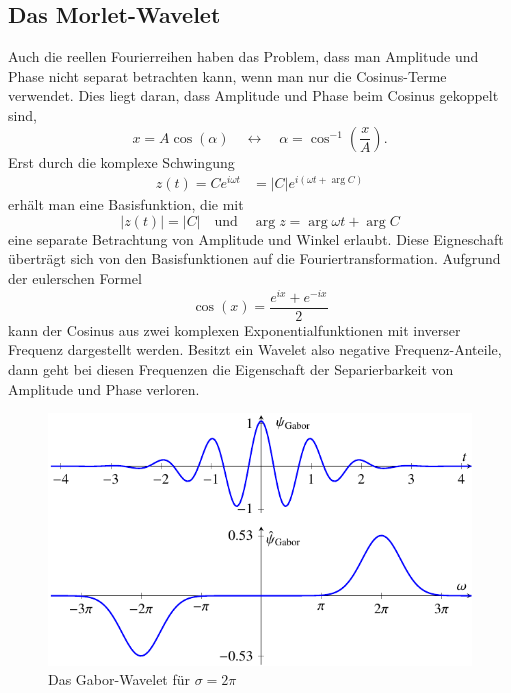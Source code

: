 \begin{refsection}

\section{Das Morlet-Wavelet}
Auch die reellen Fourierreihen haben das Problem, dass man Amplitude und Phase nicht separat betrachten kann, wenn man nur die Cosinus-Terme verwendet.
Dies liegt daran, dass Amplitude und Phase beim Cosinus gekoppelt sind,
\[
x = A\cos(\alpha) \quad\leftrightarrow\quad \alpha = \cos^{-1}\left(\frac{x}{A}\right).
\]
Erst durch die komplexe Schwingung 
\begin{align*}
	z(t) = Ce^{i\omega t} &= |C|e^{i\left(\omega t + \arg C\right)}
\end{align*}
erhält man eine Basisfunktion, die mit
\[
	|z(t)| = |C| \quad \text{und}\quad
	\arg z = \arg \omega t + \arg C
\]
eine separate Betrachtung von Amplitude und Winkel erlaubt.
Diese Eigneschaft überträgt sich von den Basisfunktionen auf die Fouriertransformation.
Aufgrund der eulerschen Formel
\begin{equation}
	\cos(x) = \frac{e^{ix} + e^{-ix}}{2}\label{complex:euler}
\end{equation}
kann der Cosinus aus zwei komplexen Exponentialfunktionen mit inverser Frequenz dargestellt werden.
Besitzt ein Wavelet also negative Frequenz-Anteile, dann geht bei diesen Frequenzen die Eigenschaft der Separierbarkeit von Amplitude und Phase verloren.

\begin{figure}
	\centering
	\includegraphics{papers/complex/images/gabor.pdf}
	\caption{Das Gabor-Wavelet für $\sigma = 2\pi$ \label{complex:gabor}}
\end{figure}


\end{refsection}
